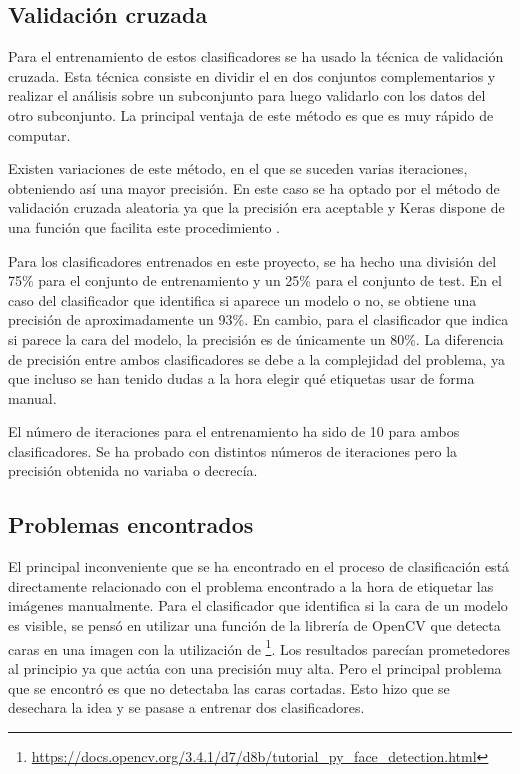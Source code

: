 \subsection{Validación cruzada}
Para el entrenamiento de estos clasificadores se ha usado la técnica de validación cruzada. Esta técnica consiste en dividir el  en dos conjuntos complementarios y realizar el análisis sobre un subconjunto para luego validarlo con los datos del otro subconjunto. La principal ventaja de este método es que es muy rápido de computar.

Existen variaciones de este método, en el que se suceden varias iteraciones, obteniendo así una mayor precisión. En este caso se ha optado por el método de validación cruzada aleatoria ya que la precisión era aceptable y Keras dispone de una función que facilita este procedimiento \cite{wiki:cruzada}. 


Para los clasificadores entrenados en este proyecto, se ha hecho una división del 75\% para el conjunto de entrenamiento y un 25\% para el conjunto de test. En el caso del clasificador que identifica si aparece un modelo o no, se obtiene una precisión de aproximadamente un 93\%. En cambio, para el clasificador que indica si parece la cara del modelo, la precisión es de únicamente un 80\%. La diferencia de precisión entre ambos clasificadores se debe a la complejidad del problema, ya que incluso se han tenido dudas a la hora elegir qué etiquetas usar de forma manual.


El número de iteraciones para el entrenamiento ha sido de 10 para ambos clasificadores. Se ha probado con distintos números de iteraciones pero la precisión obtenida no variaba o decrecía.

\subsection{Problemas encontrados}

El principal inconveniente que se ha encontrado en el proceso de clasificación está directamente relacionado con el problema encontrado a la hora de etiquetar las imágenes manualmente. Para el clasificador que identifica si la cara de un modelo es visible, se pensó en utilizar una función de la librería de OpenCV que detecta caras en una imagen con la utilización de \footnote{\url{https://docs.opencv.org/3.4.1/d7/d8b/tutorial_py_face_detection.html}}. Los resultados parecían prometedores al principio ya que actúa con una precisión muy alta. Pero el principal problema que se encontró es que no detectaba las caras cortadas. Esto hizo que se desechara la idea y se pasase a entrenar dos clasificadores.

